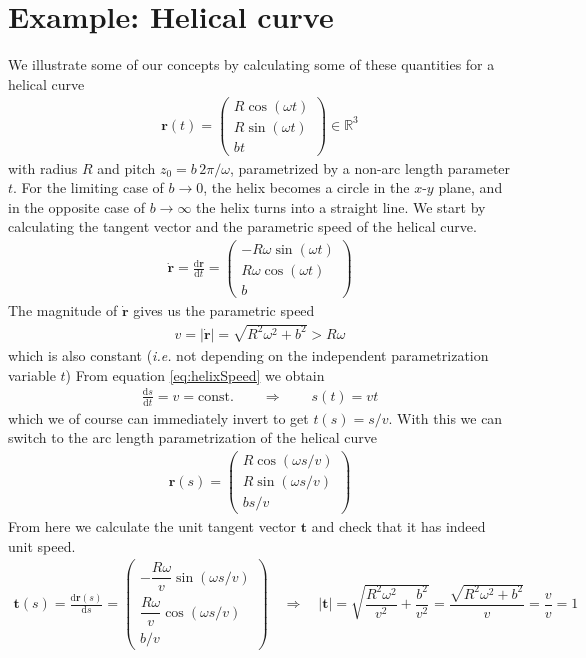 \documentclass[11pt, DINA4, fleqn]{amsart}
\def\df{\mathrm{d}\xspace}
\newcommand{\dd}[2]{\frac{\df#1}{\df#2}}
\def\vr{\boldsymbol{r}\xspace}
\def\vrd{\dot{\vr}\xspace}
\def\vt{\boldsymbol{t}\xspace}
\begin{document}
\section{Example: Helical curve}
We illustrate some of our concepts by calculating some of these quantities for a helical curve
\begin{align}
\vr(t) = \begin{pmatrix}
R\cos(\omega t) \\
R\sin(\omega t) \\
bt
\end{pmatrix} \in \mathbb{R}^3
\end{align}
with radius $R$ and pitch $z_0 = b \, 2\pi / \omega$, parametrized by a non-arc length parameter $t$. For the limiting case of $b\rightarrow 0$, the helix becomes a circle in the $x$-$y$ plane, and in the opposite case of $b\rightarrow \infty$ the helix turns into a straight line.
We start by calculating the tangent vector and the parametric speed of the helical curve.
\begin{align}
\vrd = \dd{\vr}{t} = \begin{pmatrix}
-R\omega \sin(\omega t) \\
R\omega \cos(\omega t) \\
b
\end{pmatrix}
\end{align}
The magnitude of $\vrd$ gives us the parametric speed
\begin{align}
v = |\vrd| = \sqrt{R^2\omega^2 + b^2} > R\omega
\label{eq:helixSpeed}
\end{align}
which is also constant (\textit{i.e.} not depending on the independent parametrization variable $t$)
From equation \eqref{eq:helixSpeed} we obtain
\begin{align}
\dd{s}{t} = v = \text{const.}\qquad \Longrightarrow \qquad s(t) = v t
\end{align}
which we of course can immediately invert to get $t(s) = s/v$. With this we can switch to the arc length parametrization of the helical curve
\begin{align}
\vr(s) = \begin{pmatrix}
R\cos(\omega s/v) \\
R\sin(\omega s/v) \\
bs/v
\end{pmatrix}
\end{align}
From here we calculate the unit tangent vector $\vt$ and check that it has indeed unit speed.
\begin{align}
\vt(s) = \dd{\vr(s)}{s} = 
\begin{pmatrix}
-\dfrac{R\omega}{v}\sin(\omega s/v) \\
\dfrac{R\omega}{v}\cos(\omega s/v) \\
b/v
\end{pmatrix} \quad \Longrightarrow \quad
|\vt| = \sqrt{\dfrac{R^2\omega^2}{v^2} + \dfrac{b^2}{v^2}}
= \dfrac{\sqrt{R^2\omega^2 + b^2}}{v} = \dfrac{v}{v} = 1
\end{align} 
\end{document}

